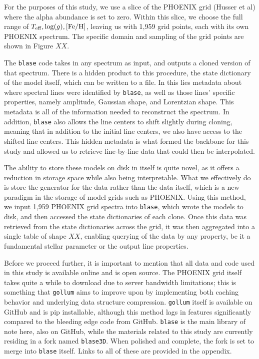\documentclass[twocolumn]{aastex631}
\def\Teff{T_{\rm eff}}
\def\logg{\log(g)}
\def\Z{\mathrm{[Fe/H]}}
\begin{document}
For the purposes of this study, we use a slice of the PHOENIX grid (Husser et al) where the alpha abundance
is set to zero. Within this slice, we choose the full range of $\Teff, \logg, \Z$, leaving us with 1,959
grid points, each with its own PHOENIX spectrum. The specific domain and
sampling of the grid points are shown in Figure $XX$.

The \texttt{blase} code takes in any spectrum as input, and outputs a cloned
version of that spectrum. There is a hidden product to this
procedure, the state dictionary of the model itself, which can be written to a file. In this lies metadata about
where spectral lines were identified by \texttt{blase}, as well as those lines'
specific properties, namely amplitude, Gaussian shape, and Lorentzian shape. This metadata is 
all of the information needed to reconstruct the spectrum.
In addition, \texttt{blase} also allows the line centers to shift slightly during
cloning, meaning that in addition to the initial line centers, we
also have access to the shifted line centers. This hidden metadata is what
formed the backbone for this study and allowed us to retrieve line-by-line data
that could then be interpolated. 

The ability to store these models on disk in itself is quite novel, as it offers a reduction
in storage space while also being interpretable. What we effectively do is store the
generator for the data rather than the data itself, which is a new paradigm in the 
storage of model grids such as PHOENIX.
Using this method, we input 1,959 PHOENIX grid spectra into \texttt{blase},
which wrote the models to disk, and then accessed the state dictionaries of each clone. Once this data was retrieved from the state dictionaries
across the grid, it was then aggregated into a single table of shape $XX$, enabling
querying of the data by any property, be it a fundamental stellar parameter or the output
line properties.

Before we proceed further, it is important to mention that all data and code used in this study is available online and is open source. The PHOENIX grid itself takes quite a while to download
due to server bandwidth limitations; this is something that \texttt{gollum} aims to
improve upon by implementing both caching behavior and underlying data structure compression.
\texttt{gollum} itself is available on GitHub and is pip installable, although this
method lags in features significantly compared to the bleeding edge code from GitHub.
\texttt{blase} is the main library of note here, also on GitHub, while the
materials related to this study are currently residing in a fork named \texttt{blase3D}. When polished and complete,
the fork is set to merge into \texttt{blase} itself. Links to all of these are provided in the appendix.
\end{document}
